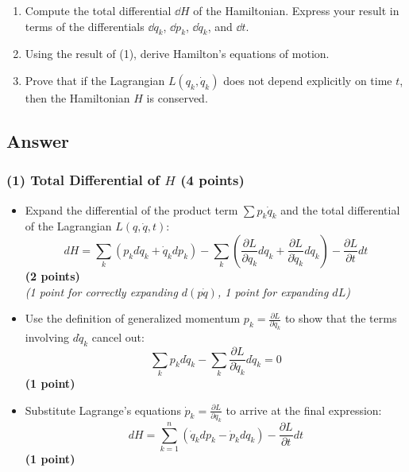 \documentclass[11pt, a4paper]{article} %
\begin{document}
\begin{enumerate}
  \item[(1)] Compute the total differential $\dd H$ of the Hamiltonian. Express your result in terms of the differentials $\dd q_k$, $\dd p_k$, $\dd\dot{q}_k$, and $\dd t$. 
  
  \item[(2)] Using the result of (1), derive Hamilton's equations of motion.
  
  \item[(3)] Prove that if the Lagrangian $L(q_k, \dot{q}_k)$ does not depend explicitly on time $t$, then the Hamiltonian $H$ is conserved.

\end{enumerate}
\subsection*{Answer}

\subsubsection*{(1) Total Differential of $H$ (4 points)}
\begin{itemize}
    \item Expand the differential of the product term $\sum p_k \dot{q}_k$ and the total differential of the Lagrangian $L(q, \dot{q}, t)$:
    \[
    dH = \sum_k (p_k d\dot{q}_k + \dot{q}_k dp_k) - \sum_k \left( \frac{\partial L}{\partial q_k} dq_k + \frac{\partial L}{\partial \dot{q}_k} d\dot{q}_k \right) - \frac{\partial L}{\partial t} dt
    \]
    \hfill \textbf{(2 points)} \\
    \textit{(1 point for correctly expanding $d(p\dot{q})$, 1 point for expanding $dL$)}

    \item Use the definition of generalized momentum $p_k = \frac{\partial L}{\partial \dot{q}_k}$ to show that the terms involving $d\dot{q}_k$ cancel out:
    \[
    \sum_k p_k d\dot{q}_k - \sum_k \frac{\partial L}{\partial \dot{q}_k} d\dot{q}_k = 0
    \]
    \hfill \textbf{(1 point)}

    \item Substitute Lagrange's equations $\dot{p}_k = \frac{\partial L}{\partial q_k}$ to arrive at the final expression:
    \[
    dH = \sum_{k=1}^n \left( \dot{q}_k dp_k - \dot{p}_k dq_k \right) - \frac{\partial L}{\partial t} dt
    \]
    \hfill \textbf{(1 point)}
\end{itemize}
\end{document}
